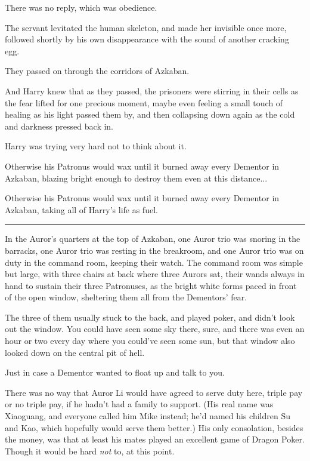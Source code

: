 There was no reply, which was obedience.

The servant levitated the human skeleton, and made her invisible once
more, followed shortly by his own disappearance with the sound of
another cracking egg.

They passed on through the corridors of Azkaban.

And Harry knew that as they passed, the prisoners were stirring in their
cells as the fear lifted for one precious moment, maybe even feeling a
small touch of healing as his light passed them by, and then collapsing
down again as the cold and darkness pressed back in.

Harry was trying very hard not to think about it.

Otherwise his Patronus would wax until it burned away every Dementor in
Azkaban, blazing bright enough to destroy them even at this
distance...

Otherwise his Patronus would wax until it burned away every Dementor in
Azkaban, taking all of Harry's life as fuel.

\begin{center}\rule{3in}{0.4pt}\end{center}

In the Auror's quarters at the top of Azkaban, one Auror trio was
snoring in the barracks, one Auror trio was resting in the breakroom,
and one Auror trio was on duty in the command room, keeping their watch.
The command room was simple but large, with three chairs at back where
three Aurors sat, their wands always in hand to sustain their three
Patronuses, as the bright white forms paced in front of the open window,
sheltering them all from the Dementors' fear.

The three of them usually stuck to the back, and played poker, and
didn't look out the window. You could have seen some sky there, sure,
and there was even an hour or two every day where you could've seen some
sun, but that window also looked down on the central pit of hell.

Just in case a Dementor wanted to float up and talk to you.

There was no way that Auror Li would have agreed to serve duty here,
triple pay or no triple pay, if he hadn't had a family to support. (His
real name was Xiaoguang, and everyone called him Mike instead; he'd
named his children Su and Kao, which hopefully would serve them better.)
His only consolation, besides the money, was that at least his mates
played an excellent game of Dragon Poker. Though it would be hard
\emph{not} to, at this point.

